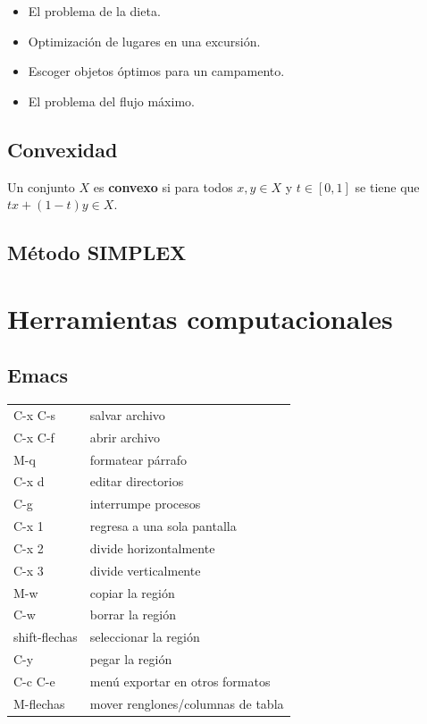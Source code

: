 \documentclass[11pt]{article}
\begin{document}
\begin{itemize}
\item El problema de la dieta.
\item Optimización de lugares en una excursión.
\item Escoger objetos óptimos para un campamento.
\item El problema del flujo máximo.
\end{itemize}

\subsection{Convexidad}
\label{sec:orga16a443}

Un conjunto \(X\) es \textbf{convexo} si para todos \(x,y\in X\) y
\(t\in[0,1]\) se tiene que \(tx + (1-t)y \in X\).
\subsection{Método SIMPLEX}
\label{sec:orgde8861b}

\section{Herramientas computacionales}
\label{sec:orgb85ae47}
\subsection{Emacs}
\label{sec:org5e6f372}

\begin{center}
\begin{tabular}{ll}
C-x C-s & salvar archivo\\
C-x C-f & abrir archivo\\
M-q & formatear párrafo\\
C-x d & editar directorios\\
C-g & interrumpe procesos\\
C-x 1 & regresa a una sola pantalla\\
C-x 2 & divide horizontalmente\\
C-x 3 & divide verticalmente\\
M-w & copiar la región\\
C-w & borrar la región\\
shift-flechas & seleccionar la región\\
C-y & pegar la región\\
C-c C-e & menú exportar en otros formatos\\
M-flechas & mover renglones/columnas de tabla\\
\end{tabular}
\end{center}
\end{document}
